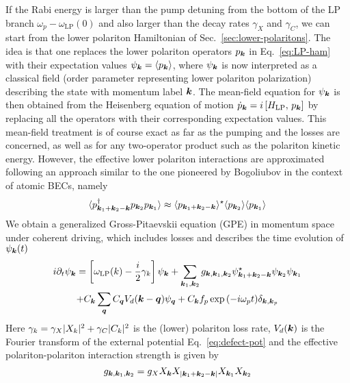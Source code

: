 If the Rabi energy is larger than the pump detuning from the bottom of
the LP branch $\omega_p - \omega_{\text{LP}}(0)$ and also larger than
the decay rates $\gamma_X$ and $\gamma_C$, we can start from the lower
polariton Hamiltonian of Sec.~\ref{sec:lower-polaritons}.  The idea
is that one replaces the lower polariton operators $p_{\bm{k}}$ in
Eq.~\eqref{eq:LP-ham} with their expectation values
$\psi_{\bm{k}} = \langle p_{\bm{k}} \rangle$, where $\psi_{\bm{k}}$ is now
interpreted as a classical field (order parameter representing lower
polariton polarization) describing the state with momentum label
$\bm{k}$. The mean-field equation for $\psi_{\bm{k}}$ is then obtained from
the Heisenberg equation of motion
$\dot{p}_{\bm{k}} =i \left[ H_{\text{LP}},\, p_{\bm{k}} \right]$ by
replacing all the operators with their corresponding expectation
values. This mean-field treatment is of course exact as far as the
pumping and the losses are concerned, as well as for any two-operator
product such as the polariton kinetic energy. However, the effective
lower polariton interactions are approximated following an approach
similar to the one pioneered by Bogoliubov in the context of atomic
BECs, namely
%
\begin{equation}\label{eq:mean-field-approx}
  \langle p^{\dagger}_{\bm{k}_1 + \bm{k}_2 - \bm{k}} p_{\bm{k}_2} p_{\bm{k}_1} \rangle \approx \langle p_{\bm{k}_1 + \bm{k}_2 - \bm{k}} \rangle^{\star} \langle p_{\bm{k}_2} \rangle \langle p_{\bm{k}_1} \rangle
\end{equation}
% 
We obtain a generalized Gross-Pitaevskii equation (GPE) in momentum
space under coherent driving, which includes losses and describes the
time evolution of $\psi_{\bm{k}}(t)$
%
\begin{multline}\label{eq:mom-GPE}
  i\partial_t\psi_{\bm{k}} = \left[\omega_{\text{LP}}(k) - \frac{i}{2} \gamma_k\right]\psi_{\bm{k}} + \sum_{\bm{k}_1,\bm{k}_2} g_{\bm{k},\bm{k}_1,\bm{k}_2} \psi^{\star}_{\bm{k}_1 + \bm{k}_2 - \bm{k}} \psi_{\bm{k}_2} \psi_{\bm{k}_1}\\
  + C_{\bm{k}} \sum_{\bm{q}} C_{\bm{q}} V_d(\bm{k} - \bm{q}) \psi_{\bm{q}}
  + C_{\bm{k}} f_p \exp{\left(-i \omega_pt\right)} \delta_{\bm{k},\bm{k}_{p}}
\end{multline}
Here $\gamma_k = \gamma_X \vert X_k \vert^2 + \gamma_C \vert C_k \vert^2$ is the
(lower) polariton loss rate, $V_d(\bm{k})$ is the Fourier transform of
the external potential Eq.~\eqref{eq:defect-pot} and the effective
polariton-polariton interaction strength is given by
%
\begin{equation}\label{eq:LP-inter}
  g_{\bm{k},\bm{k}_1,\bm{k}_2} = g_X X_{\bm{k}}X_{\vert\bm{k}_1 + \bm{k}_2 - \bm{k}\vert}X_{\bm{k}_1}X_{\bm{k}_2}
\end{equation}

